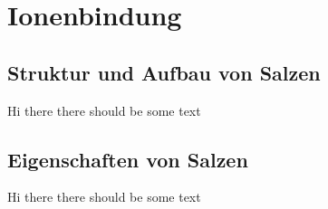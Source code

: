 \section{Ionenbindung}

\subsection{Struktur und Aufbau von Salzen}

Hi there there should be some text

\subsection{Eigenschaften von Salzen}

Hi there there should be some text